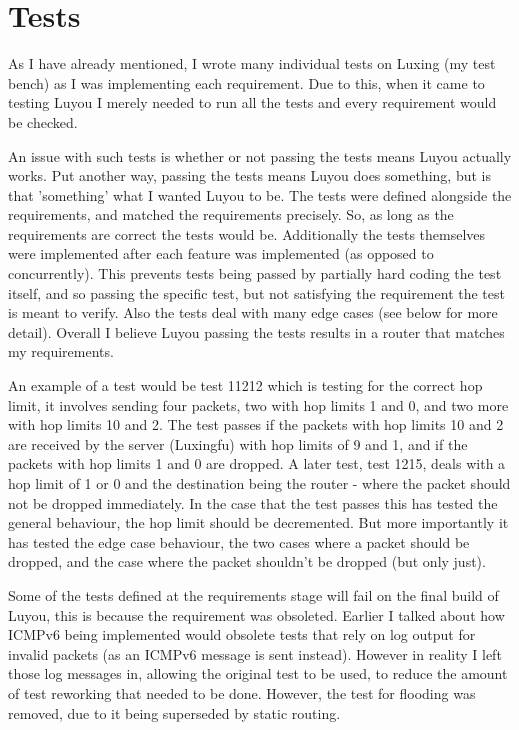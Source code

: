 \documentclass[12pt,a4paper,twoside,openright]{report}
\begin{document}
\section{Tests}

As I have already mentioned, I wrote many individual tests on Luxing (my test bench) as I was implementing each requirement.  Due to this, when it came to testing Luyou I merely needed to run all the tests and every requirement would be checked.

\bigskip

An issue with such tests is whether or not passing the tests means Luyou actually works. Put another way, passing the tests means Luyou does something, but is that 'something' what I wanted Luyou to be.  The tests were defined alongside the requirements, and matched the requirements precisely.  So, as long as the requirements are correct the tests would be.  Additionally the tests themselves were implemented after each feature was implemented (as opposed to concurrently).  This prevents tests being passed by partially hard coding the test itself, and so passing the specific test, but not satisfying the requirement the test is meant to verify. Also the tests deal with many edge cases (see below for more detail). Overall I believe Luyou passing the tests results in a router that matches my requirements.

\bigskip

An example of a test would be test 11212 which is testing for the correct hop limit, it involves sending four packets, two with hop limits 1 and 0, and two more with hop limits 10 and 2.  The test passes if the packets with hop limits 10 and 2 are received by the server (Luxingfu) with hop limits of 9 and 1, and if the packets with hop limits 1 and 0 are dropped. A later test, test 1215, deals with a hop limit of 1 or 0 and the destination being the router - where the packet should not be dropped immediately.  In the case that the test passes this has tested the general behaviour, the hop limit should be decremented. But more importantly it has tested the edge case behaviour, the two cases where a packet should be dropped, and the case where the packet shouldn't be dropped (but only just).

\bigskip

Some of the tests defined at the requirements stage will fail on the final build of Luyou, this is because the requirement was obsoleted. Earlier I talked about how ICMPv6 being implemented would obsolete tests that rely on log output for invalid packets (as an ICMPv6 message is sent instead). However in reality I left those log messages in, allowing the original test to be used, to reduce the amount of test reworking that needed to be done.  However, the test for flooding was removed, due to it being superseded by static routing. 
\end{document}
